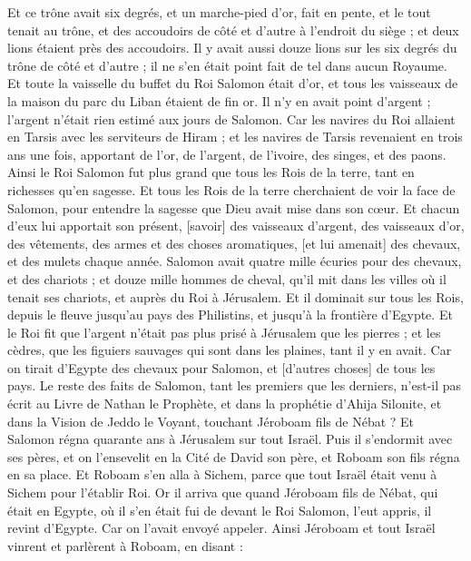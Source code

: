 \begin{multicols}{2}
Et ce trône avait six degrés, et un marche-pied d'or, fait en pente, et le tout tenait au trône, et des accoudoirs de côté et d'autre à l'endroit du siège ; et deux lions étaient près des accoudoirs.
Il y avait aussi douze lions sur les six degrés du trône de côté et d'autre ; il ne s'en était point fait de tel dans aucun Royaume.
Et toute la vaisselle du buffet du Roi Salomon était d'or, et tous les vaisseaux de la maison du parc du Liban étaient de fin or. Il n'y en avait point d'argent ; l'argent n'était rien estimé aux jours de Salomon.
Car les navires du Roi allaient en Tarsis avec les serviteurs de Hiram ; et les navires de Tarsis revenaient en trois ans une fois, apportant de l'or, de l'argent, de l'ivoire, des singes, et des paons.
Ainsi le Roi Salomon fut plus grand que tous les Rois de la terre, tant en richesses qu'en sagesse.
Et tous les Rois de la terre cherchaient de voir la face de Salomon, pour entendre la sagesse que Dieu avait mise dans son cœur.
Et chacun d'eux lui apportait son présent, [savoir] des vaisseaux d'argent, des vaisseaux d'or, des vêtements, des armes et des choses aromatiques, [et lui amenait] des chevaux, et des mulets chaque année.
Salomon avait quatre mille écuries pour des chevaux, et des chariots ; et douze mille hommes de cheval, qu'il mit dans les villes où il tenait ses chariots, et auprès du Roi à Jérusalem.
Et il dominait sur tous les Rois, depuis le fleuve jusqu'au pays des Philistins, et jusqu'à la frontière d'Egypte.
Et le Roi fit que l'argent n'était pas plus prisé à Jérusalem que les pierres ; et les cèdres, que les figuiers sauvages qui sont dans les plaines, tant il y en avait.
Car on tirait d'Egypte des chevaux pour Salomon, et [d'autres choses] de tous les pays.
Le reste des faits de Salomon, tant les premiers que les derniers, n'est-il pas écrit au Livre de Nathan le Prophète, et dans la prophétie d'Ahija Silonite, et dans la Vision de Jeddo le Voyant, touchant Jéroboam fils de Nébat ?
Et Salomon régna quarante ans à Jérusalem sur tout Israël.
Puis il s'endormit avec ses pères, et on l'ensevelit en la Cité de David son père, et Roboam son fils régna en sa place.
\VerseOne{}Et Roboam s'en alla à Sichem, parce que tout Israël était venu à Sichem pour l'établir Roi.
Or il arriva que quand Jéroboam fils de Nébat, qui était en Egypte, où il s'en était fui de devant le Roi Salomon, l'eut appris, il revint d'Egypte.
Car on l'avait envoyé appeler. Ainsi Jéroboam et tout Israël vinrent et parlèrent à Roboam, en disant :

\end{multicols}
